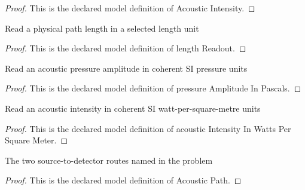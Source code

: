 \begin{proof}
  This is the declared model definition of Acoustic Intensity.
\end{proof}
\begin{definition}
  \label{def:physics:phyx-mini-0325:phyxminiproblems-problemphyxmini0325-lengthreadout}
  Read a physical path length in a selected length unit
\end{definition}
\begin{proof}
  This is the declared model definition of length Readout.
\end{proof}
\begin{definition}
  \label{def:physics:phyx-mini-0325:phyxminiproblems-problemphyxmini0325-pressureamplitudeinpascals}
  Read an acoustic pressure amplitude in coherent SI pressure units
\end{definition}
\begin{proof}
  This is the declared model definition of pressure Amplitude In Pascals.
\end{proof}
\begin{definition}
  \label{def:physics:phyx-mini-0325:phyxminiproblems-problemphyxmini0325-acousticintensityinwattspersquaremeter}
  Read an acoustic intensity in coherent SI watt-per-square-metre units
\end{definition}
\begin{proof}
  This is the declared model definition of acoustic Intensity In Watts Per Square Meter.
\end{proof}
\begin{definition}
  \label{def:physics:phyx-mini-0325:phyxminiproblems-problemphyxmini0325-acousticpath}
  The two source-to-detector routes named in the problem
\end{definition}
\begin{proof}
  This is the declared model definition of Acoustic Path.
\end{proof}
